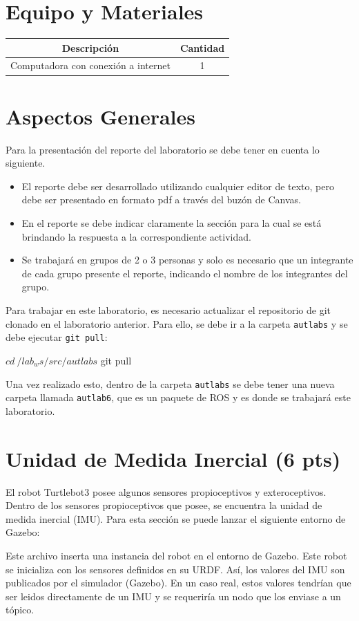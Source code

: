 \documentclass[a4paper,11pt]{robotlabs}
\begin{document}
\section{Equipo y Materiales}

\begin{table}[h]
  \centering
  \begin{tabular}{cc}
    \toprule
    \textbf{Descripción} & \textbf{Cantidad} \\
    \midrule
    Computadora con conexi\'on a internet & 1 \\
    \bottomrule
    \end{tabular}
  \end{table}

\section{Aspectos Generales}

Para la presentación del reporte  del laboratorio se debe tener en cuenta lo
siguiente.
\begin{itemize}
\item El reporte debe ser desarrollado utilizando cualquier editor de texto,
  pero debe ser presentado en formato pdf a través del buzón de
  Canvas.
\item En el reporte se debe indicar claramente la sección para la cual se está
  brindando la respuesta a la correspondiente actividad.
\item Se trabajará en grupos de 2 o 3 personas y solo es necesario que un
  integrante de cada grupo presente el reporte, indicando el nombre de los
  integrantes del grupo.
\end{itemize}
Para trabajar en este laboratorio, es necesario actualizar el repositorio de
git clonado en el laboratorio anterior. Para ello, se debe ir a la carpeta
\texttt{autlabs} y se debe ejecutar \texttt{git pull}:
\begin{listingshell}
$ cd ~/lab_ws/src/autlabs
$ git pull
\end{listingshell}
\noindent Una vez realizado esto, dentro de la carpeta \texttt{autlabs} se debe
tener una nueva carpeta llamada \texttt{autlab6}, que es un paquete de ROS y es
donde se trabajará este laboratorio.


\section{Unidad de Medida Inercial (6 pts)}

El robot Turtlebot3 posee algunos sensores propioceptivos y
exteroceptivos. Dentro de los sensores propioceptivos que posee, se encuentra
la unidad de medida inercial (IMU). Para esta sección se puede lanzar el
siguiente entorno de Gazebo:
\noindent Este archivo inserta una instancia del robot en el entorno de
Gazebo. Este robot se inicializa con los sensores definidos en su URDF. Así,
los valores del IMU son publicados por el simulador (Gazebo). En un caso real,
estos valores tendrían que ser leidos directamente de un IMU y se requeriría un
nodo que los enviase a un tópico.
\end{document}
